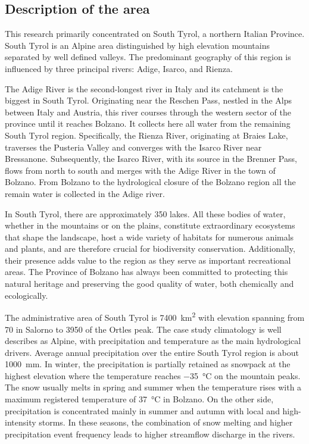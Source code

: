\subsection{Description of the area}
This research primarily concentrated on South Tyrol, a northern Italian Province. South Tyrol is an Alpine area distinguished by high elevation mountains separated by well defined valleys. The predominant geography of this region is influenced by three principal rivers: Adige, Isarco, and Rienza.

The Adige River is the second-longest river in Italy and its catchment is the biggest in South Tyrol. Originating near the Reschen Pass, nestled in the Alps between Italy and Austria, this river courses through the western sector of the province until it reaches Bolzano. It collects here all water from the remaining South Tyrol region. Specifically, the Rienza River, originating at Braies Lake, traverses the Pusteria Valley and converges with the Isarco River near Bressanone. Subsequently, the Isarco River, with its source in the Brenner Pass, flows from north to south and merges with the Adige River in the town of Bolzano. From Bolzano to the hydrological closure of the Bolzano region all the remain water is collected in the Adige river.

In South Tyrol, there are approximately 350 lakes. All these bodies of water, whether in the mountains or on the plains, constitute extraordinary ecosystems that shape the landscape, host a wide variety of habitats for numerous animals and plants, and are therefore crucial for biodiversity conservation. Additionally, their presence adds value to the region as they serve as important recreational areas. The Province of Bolzano has always been committed to protecting this natural heritage and preserving the good quality of water, both chemically and ecologically.

The administrative area of South Tyrol is \SI{7400}{km^2} with elevation spanning from \SI{70}{\elevationunit} in Salorno to \SI{3950}{\elevationunit} of the Ortles peak. The case study climatology is well describes as Alpine, with precipitation and temperature as the main hydrological drivers. Average annual precipitation over the entire South Tyrol region is about \SI{1000}{mm}. In winter, the precipitation is partially retained as snowpack at the highest elevation where the temperature reaches \SI{-35}{\celsius} on the mountain peaks. The snow usually melts in spring and summer when the temperature rises with a maximum registered temperature of \SI{37}{\celsius} in Bolzano. On the other side, precipitation is concentrated mainly in summer and autumn with local and high-intensity storms. In these seasons, the combination of snow melting and higher precipitation event frequency leads to higher streamflow discharge in the rivers.

